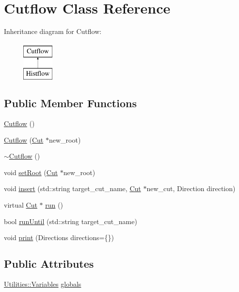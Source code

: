 \hypertarget{classCutflow}{}\section{Cutflow Class Reference}
\label{classCutflow}
Inheritance diagram for Cutflow\+:\begin{figure}[H]
\begin{center}
\leavevmode
\includegraphics[height=2.000000cm]{classCutflow}
\end{center}
\end{figure}
\subsection*{Public Member Functions}
\begin{DoxyCompactItemize}
\item 
\hyperlink{classCutflow_a17811cb40a7906fc65e79ce69e3b21be}{Cutflow} ()
\item 
\hyperlink{classCutflow_a943ac94db62104f63499c41b5aa83b4d}{Cutflow} (\hyperlink{classCut}{Cut} $\ast$new\+\_\+root)
\item 
\hyperlink{classCutflow_adb300cd78d57a287934e4d22856a0ffe}{$\sim$\+Cutflow} ()
\item 
void \hyperlink{classCutflow_ad27d37141c3748779a5d81fad919ecbb}{set\+Root} (\hyperlink{classCut}{Cut} $\ast$new\+\_\+root)
\item 
void \hyperlink{classCutflow_a8da46f1053a6b97991489ee0920c29a1}{insert} (std\+::string target\+\_\+cut\+\_\+name, \hyperlink{classCut}{Cut} $\ast$new\+\_\+cut, Direction direction)
\item 
virtual \hyperlink{classCut}{Cut} $\ast$ \hyperlink{classCutflow_a563da4fc41aa5c611dd0ce37ce966f2c}{run} ()
\item 
bool \hyperlink{classCutflow_a3b5a6dc6e9490037d190eca691295859}{run\+Until} (std\+::string target\+\_\+cut\+\_\+name)
\item 
void \hyperlink{classCutflow_a5d9f9fa315303fa9f63738dd41c05042}{print} (Directions directions=\{\})
\end{DoxyCompactItemize}
\subsection*{Public Attributes}
\begin{DoxyCompactItemize}
\item 
\hyperlink{classUtilities_1_1Variables}{Utilities\+::\+Variables} \hyperlink{classCutflow_a71390324488ac6ed4a72c41f4a2c1c10}{globals}
\end{DoxyCompactItemize}
